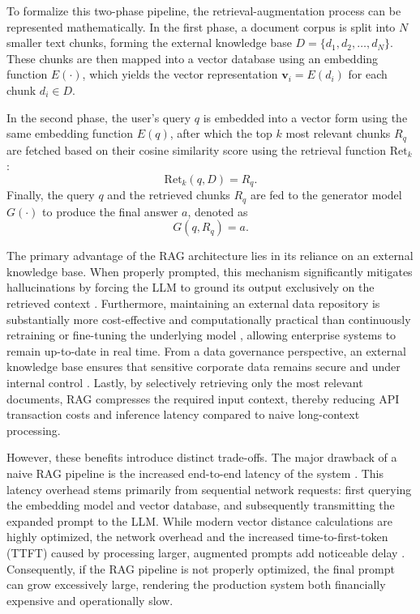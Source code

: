 To formalize this two-phase pipeline, the retrieval-augmentation process can be represented mathematically. In the first phase, a document corpus is split into $N$ smaller text chunks, forming the external knowledge base $D = \{d_1, d_2, \ldots, d_N\}$. These chunks are then mapped into a vector database using an embedding function $E(\cdot)$, which yields the vector representation $\mathbf{v}_i = E(d_i)$ for each chunk $d_i \in D$.

In the second phase, the user's query $q$ is embedded into a vector form using the same embedding function $E(q)$, after which the top $k$ most relevant chunks $R_q$ are fetched based on their cosine similarity score using the retrieval function $\text{Ret}_k$:
\begin{equation}
    \text{Ret}_k(q, D) = R_q.
\end{equation}
Finally, the query $q$ and the retrieved chunks $R_q$ are fed to the generator model $G(\cdot)$ to produce the final answer $a$, denoted as
\begin{equation}
    G(q, R_q) = a.
\end{equation}

The primary advantage of the RAG architecture lies in its reliance on an external knowledge base. When properly prompted, this mechanism significantly mitigates hallucinations by forcing the LLM to ground its output exclusively on the retrieved context \citep{shuster2021retrieval}. Furthermore, maintaining an external data repository is substantially more cost-effective and computationally practical than continuously retraining or fine-tuning the underlying model \citep{gao2023retrieval}, allowing enterprise systems to remain up-to-date in real time. From a data governance perspective, an external knowledge base ensures that sensitive corporate data remains secure and under internal control \citep{ni2025towards}. Lastly, by selectively retrieving only the most relevant documents, RAG compresses the required input context, thereby reducing API transaction costs and inference latency compared to naive long-context processing.

However, these benefits introduce distinct trade-offs. The major drawback of a naive RAG pipeline is the increased end-to-end latency of the system \citep{gao2023retrieval}. This latency overhead stems primarily from sequential network requests: first querying the embedding model and vector database, and subsequently transmitting the expanded prompt to the LLM. While modern vector distance calculations are highly optimized, the network overhead and the increased time-to-first-token (TTFT) caused by processing larger, augmented prompts add noticeable delay \citep{gao2023retrieval}. Consequently, if the RAG pipeline is not properly optimized, the final prompt can grow excessively large, rendering the production system both financially expensive and operationally slow.

